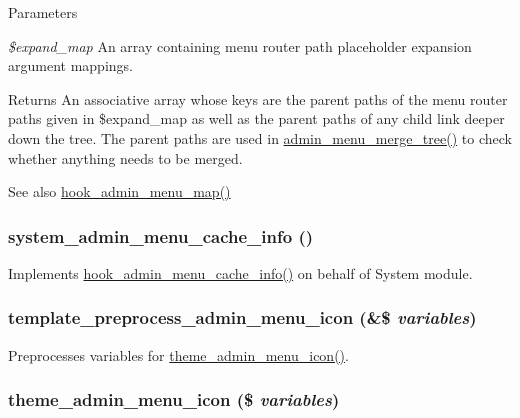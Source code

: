 \begin{DoxyParams}{Parameters}
\item[{\em \$expand\_\-map}]An array containing menu router path placeholder expansion argument mappings.\end{DoxyParams}
\begin{DoxyReturn}{Returns}
An associative array whose keys are the parent paths of the menu router paths given in \$expand\_\-map as well as the parent paths of any child link deeper down the tree. The parent paths are used in \hyperlink{admin__menu_8inc_a575d57ae5a9c1a4b8729ef022e17e019}{admin\_\-menu\_\-merge\_\-tree()} to check whether anything needs to be merged.
\end{DoxyReturn}
\begin{DoxySeeAlso}{See also}
\hyperlink{admin__menu_8api_8php_a4b3f2235db483f670a2e7327633868df}{hook\_\-admin\_\-menu\_\-map()} 
\end{DoxySeeAlso}
\hypertarget{admin__menu_8inc_addfcc1ff94f62409d4ff7fa7f523aa45}{
\subsubsection[{system\_\-admin\_\-menu\_\-cache\_\-info}]{\setlength{\rightskip}{0pt plus 5cm}system\_\-admin\_\-menu\_\-cache\_\-info ()}}
\label{admin__menu_8inc_addfcc1ff94f62409d4ff7fa7f523aa45}
Implements \hyperlink{admin__menu_8api_8php_a4458e9bb8dfc9515707b474b9faceca6}{hook\_\-admin\_\-menu\_\-cache\_\-info()} on behalf of System module. \hypertarget{admin__menu_8inc_af696ca093076e195d86786d7516ee9df}{
\subsubsection[{template\_\-preprocess\_\-admin\_\-menu\_\-icon}]{\setlength{\rightskip}{0pt plus 5cm}template\_\-preprocess\_\-admin\_\-menu\_\-icon (\&\$ {\em variables})}}
\label{admin__menu_8inc_af696ca093076e195d86786d7516ee9df}
Preprocesses variables for \hyperlink{admin__menu_8inc_ab93751624cbfa203208fba5c90192ee1}{theme\_\-admin\_\-menu\_\-icon()}. \hypertarget{admin__menu_8inc_ab93751624cbfa203208fba5c90192ee1}{
\subsubsection[{theme\_\-admin\_\-menu\_\-icon}]{\setlength{\rightskip}{0pt plus 5cm}theme\_\-admin\_\-menu\_\-icon (\$ {\em variables})}}
